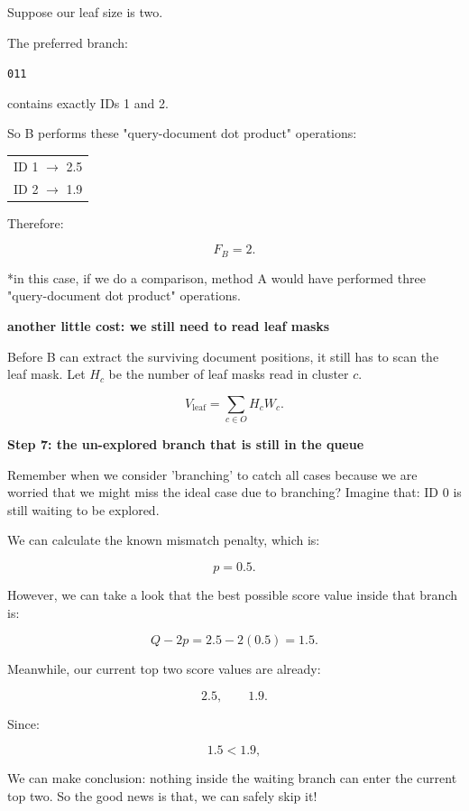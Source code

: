 Suppose our leaf size is two.

The preferred branch:

\texttt{011}

contains exactly IDs 1 and 2.

So B performs these "query-document dot product" operations:

\begin{center}\begingroup\small\ttfamily\begin{tabular}{l}
ID 1 \(\rightarrow\) 2.5\\ \relax ID 2 \(\rightarrow\) 1.9
\end{tabular}\endgroup\end{center}

Therefore:

\[
F_B=2.
\]

*in this case, if we do a comparison, method A would have performed three "query-document dot product" operations.



\textbf{another little cost: we still need to read leaf masks}\par

Before B can extract the surviving document positions, it still has to scan the leaf mask. Let \(H_c\) be the number of leaf masks read in cluster \(c\).

\[
\boxed{
V_{\text{leaf}}
=
\sum_{c\in O}H_cW_c.
}
\]




\textbf{Step 7: the un-explored branch that is still in the queue}\par

Remember when we consider 'branching' to catch all cases because we are worried that we might miss the ideal case due to branching? Imagine that: ID 0 is still waiting to be explored.

We can calculate the known mismatch penalty, which is:

\[
p=0.5.
\]

However, we can take a look that the best possible score value inside that branch is:

\[
Q-2p
=
2.5-2(0.5)
=
1.5.
\]

Meanwhile, our current top two score values are already:

\[
2.5,\qquad1.9.
\]

Since:

\[
1.5<1.9,
\]

We can make conclusion: nothing inside the waiting branch can enter the current top two. So the good news is that, we can safely skip it!


